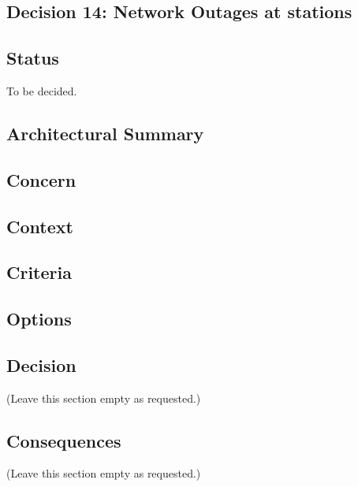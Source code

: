 \subsection{Decision 14: Network Outages at stations}

\subsection*{Status}
To be decided.

\subsection*{Architectural Summary}

\subsection*{Concern}

\subsection*{Context}


\subsection*{Criteria}


\subsection*{Options}


\subsection*{Decision}
(Leave this section empty as requested.)

\subsection*{Consequences}
(Leave this section empty as requested.)
